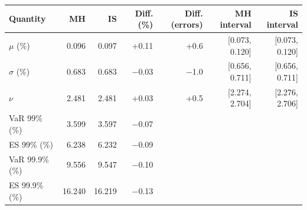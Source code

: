 \begin{tabular}{lrrrrrr}
\toprule
Quantity & MH & IS & Diff. (\%) & Diff. (errors) & MH interval & IS interval \\
\midrule
$\mu$ (\%) & 0.096 & 0.097 & +0.11 & +0.6 & [0.073, 0.120] & [0.073, 0.120] \\
$\sigma$ (\%) & 0.683 & 0.683 & $-$0.03 & $-$1.0 & [0.656, 0.711] & [0.656, 0.711] \\
$\nu$ & 2.481 & 2.481 & +0.03 & +0.5 & [2.274, 2.704] & [2.276, 2.706] \\
VaR 99\% (\%) & 3.599 & 3.597 & $-$0.07 &  &  &  \\
ES 99\% (\%) & 6.238 & 6.232 & $-$0.09 &  &  &  \\
VaR 99.9\% (\%) & 9.556 & 9.547 & $-$0.10 &  &  &  \\
ES 99.9\% (\%) & 16.240 & 16.219 & $-$0.13 &  &  &  \\
\bottomrule
\end{tabular}
